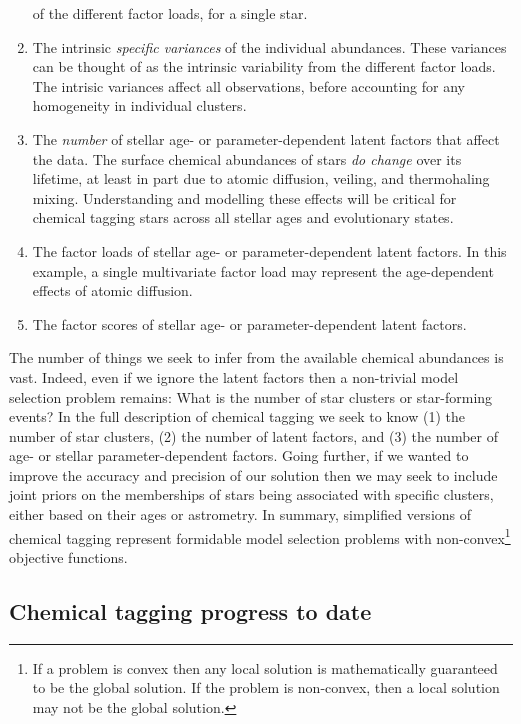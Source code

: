 \documentclass{aastex61}
\begin{document}
\begin{enumerate}
        of the different factor loads, for a single star.
  \item The intrinsic \emph{specific variances} of the individual abundances.
        These variances can be thought of as the intrinsic variability from 
        the different factor loads.
        The intrisic variances affect all observations, before accounting for
        any homogeneity in individual clusters.
  \item The \emph{number} of stellar age- or parameter-dependent latent 
        factors that affect the data. 
        The surface chemical abundances of stars \emph{do change} over its
        lifetime, at least in part due to atomic diffusion, veiling, and 
        thermohaling mixing.
        Understanding and modelling these effects will be critical for 
        chemical tagging stars across all stellar ages and evolutionary states.
  \item The factor loads of stellar age- or parameter-dependent latent factors.
        In this example, a single multivariate factor load may represent the
        age-dependent effects of atomic diffusion.
  \item The factor scores of stellar age- or parameter-dependent latent 
        factors.
\end{enumerate}

The number of things we seek to infer from the available chemical abundances
is vast.
Indeed, even if we ignore the latent factors then a non-trivial model
selection problem remains: What is the number of star clusters or star-forming 
events?
In the full description of chemical tagging we seek to know (1) the number of
star clusters, (2) the number of latent factors, and (3) the number of age-
or stellar parameter-dependent factors.
Going further, if we wanted to improve the accuracy and precision of our
solution then we may seek to include joint priors on the memberships of stars
being associated with specific clusters, either based on their ages or
astrometry.
In summary, simplified versions of chemical tagging represent formidable model
selection problems with non-convex\footnote{
  If a problem is convex then any local solution is mathematically guaranteed
  to be the global solution.
  If the problem is non-convex, then a local solution may not be the global
  solution.
} objective functions.


\subsection{Chemical tagging progress to date}
\label{sec:literature-review}
\end{document}
